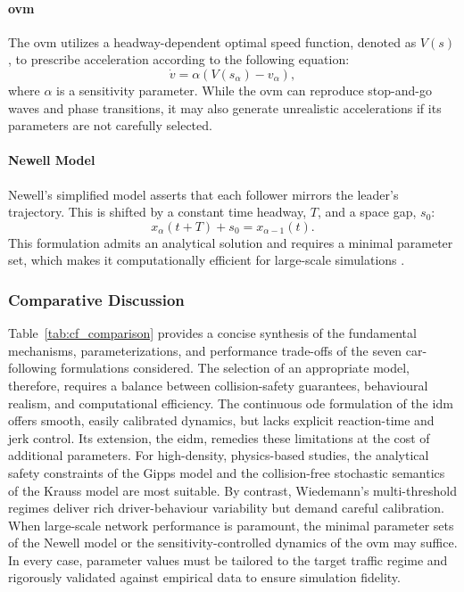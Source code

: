 \paragraph{\acf{ovm}}
The \ac{ovm} utilizes a headway-dependent optimal speed function, denoted as $V(s)$, to prescribe acceleration according to the following equation:
\begin{equation}
    \dot{v} = \alpha \left(V(s_\alpha) - v_\alpha\right),
\end{equation}
where $\alpha$ is a sensitivity parameter. While the \ac{ovm} can reproduce stop-and-go waves and phase transitions, it may also generate unrealistic accelerations if its parameters are not carefully selected. \cite{Bando1995}

\paragraph{Newell Model}
Newell’s simplified model asserts that each follower mirrors the leader’s trajectory. This is shifted by a constant time headway, $T$, and a space gap, $s_0$:
\begin{equation}
    x_\alpha(t+T) + s_0 = x_{\alpha-1}(t).
\end{equation}
This formulation admits an analytical solution and requires a minimal parameter set, which makes it computationally efficient for large-scale simulations \cite{Newell1961}.

\subsubsection*{Comparative Discussion}
Table~\vref{tab:cf_comparison} provides a concise synthesis of the fundamental mechanisms, parameterizations, and performance trade-offs of the seven car-following formulations considered. The selection of an appropriate model, therefore, requires a balance between collision-safety guarantees, behavioural realism, and computational efficiency. The continuous \ac{ode} formulation of the \ac{idm} offers smooth, easily calibrated dynamics, but lacks explicit reaction-time and jerk control. Its extension, the \ac{eidm}, remedies these limitations at the cost of additional parameters. For high-density, physics-based studies, the analytical safety constraints of the Gipps model and the collision-free stochastic semantics of the Krauss model are most suitable. By contrast, Wiedemann’s multi-threshold regimes deliver rich driver-behaviour variability but demand careful calibration. When large-scale network performance is paramount, the minimal parameter sets of the Newell model or the sensitivity-controlled dynamics of the \ac{ovm} may suffice. In every case, parameter values must be tailored to the target traffic regime and rigorously validated against empirical data to ensure simulation fidelity.

